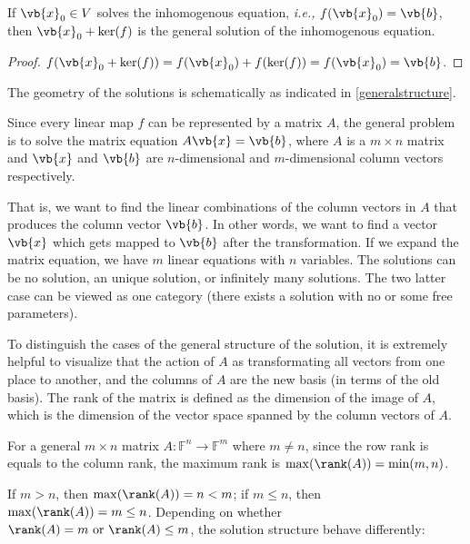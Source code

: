 \documentclass[a4paper,12pt]{report}
\begin{document}
\begin{lemma} \label{homoinhomo} 
If \(\vb{x} _{0} \in V\) solves the inhomogenous equation, \textit{i.e.,} \(f(\vb{x} _{0} ) = \vb{b}\), then \(\vb{x} _{0} + \ker (f) \) is the general solution of the inhomogenous equation.   
\end{lemma}

\begin{proof}  
    \(f(\vb{x} _{0} + \ker (f)) = f(\vb{x} _{0} ) + f(\ker (f)) = f(\vb{x} _{0} ) = \vb{b} \). 
\end{proof}

The geometry of the solutions is schematically as indicated in \cref{generalstructure}.


Since every linear map \(f\) can be represented by a matrix \(A\), the general problem is to solve the matrix equation \(A\vb{x} = \vb{b} \), where \(A\) is a \(m \times n\) matrix and \(\vb{x} \) and \(\vb{b} \) are \(n\)-dimensional and \(m\)-dimensional column vectors respectively. 

That is, we want to find the linear combinations of the column vectors in \(A\) that produces the column vector \(\vb{b} \). In other words, we want to find a vector \(\vb{x} \) which gets mapped to \(\vb{b} \) after the transformation. If we expand the matrix equation, we have \(m\) linear equations with \(n\) variables. The solutions can be no solution, an unique solution, or infinitely many solutions. The two latter case can be viewed as one category (there exists a solution with no or some free parameters).

To distinguish the cases of the general structure of the solution, it is extremely helpful to visualize that the action of \(A\) as transformating all vectors from one place to another, and the columns of \(A\) are the new basis (in terms of the old basis). The rank of the matrix is defined as the dimension of the image of \(A\), which is the dimension of the vector space spanned by the column vectors of \(A\). 

For a general \(m \times n\) matrix \(A:\mathbb{F}^{n}\to \mathbb{F}^{m}  \) where \(m \neq n\), since the row rank is equals to the column rank, the maximum rank is \(\max (\rank (A)) = \min (m,n)\). 

If \(m > n\), then \(\max (\rank (A)) = n < m\); if \(m \le n\), then \(\max (\rank (A)) = m \le n\). Depending on whether \(\rank (A) = m \text { or } \rank (A) \le m\), the solution structure behave differently:  
\end{document}
